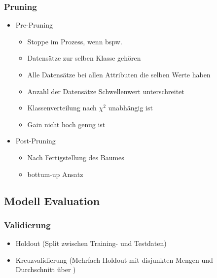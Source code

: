 \documentclass[a4paper]{article}
\begin{document}
\begin{landscape}
\begin{multicols}{3}
        \subsubsection{Pruning}
        \begin{itemize}[noitemsep,nolistsep]
            \item Pre-Pruning
                \begin{itemize}[noitemsep,nolistsep]
                    \item Stoppe im Prozess, wenn bspw.
                    \item Datensätze zur selben Klasse gehören
                    \item Alle Datensätze bei allen Attributen die selben Werte haben
                    \item Anzahl der Datensätze Schwellenwert unterschreitet
                    \item Klassenverteilung nach $\chi^2$ unabhängig ist
                    \item Gain nicht hoch genug ist
                \end{itemize}
            \item Post-Pruning
                \begin{itemize}[noitemsep,nolistsep]
                    \item Nach Fertigstellung des Baumes
                    \item bottum-up Ansatz
                \end{itemize}
        \end{itemize}

        \subsection{Modell Evaluation}
        \subsubsection{Validierung}
        \begin{itemize}[noitemsep,nolistsep]
            \item Holdout (Split zwischen Training- und Testdaten)
            \item Kreuzvalidierung (Mehrfach Holdout mit disjunkten Mengen und Durchschnitt über )
        \end{itemize}


\end{multicols}
\end{landscape}
\end{document}
